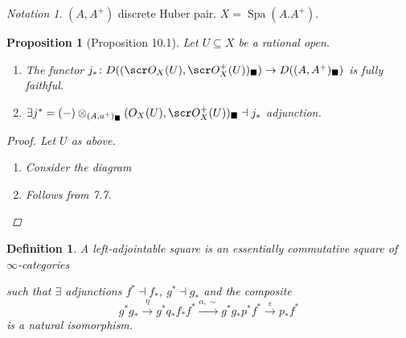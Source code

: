 \documentclass[A4paper, british, reqno]{amsart}
\theoremstyle{darkgreentheorem}
\newtheorem{prop}[thm]{Proposition}
\theoremstyle{darkbluedefinition}
\newtheorem{defn}[thm]{Definition}
\theoremstyle{darkredexample}
\theoremstyle{remark}
\newtheorem{nota}[thm]{Notation}
\DeclareMathOperator{\Cond}{Cond}
\DeclareMathOperator{\Spa}{Spa}
\newcommand{\1}{\mathbbm{1}}
\newcommand{\ot}{\otimes}
\newcommand{\sub}{\subseteq}
\newcommand{\usolid}{_{\blacksquare}}
\begin{document}
\begin{nota}
    $(A,A^{+})$ discrete Huber pair.
    $X=\Spa(A.A^{+})$.
\end{nota}

\begin{prop}[Proposition 10.1]
    Let $U\sub X$ be a rational open.
    \begin{enumerate}
	\item The functor $j_{*}\colon D((\O_{X}(U),\O_{X}^{+}(U))\usolid)\to D((A,A^{+})\usolid)$ is fully faithful.
	\item $\exists j^{*}=(-)\ot_{(A,a^{+})\usolid}(O_{X}(U),\O_{X}^{+}(U))\usolid \dashv j_{*}$ adjunction.
    \end{enumerate}
    \begin{proof}
	Let $U$ as above.
	\begin{enumerate}
	    \item Consider the diagram
		\begin{center}
		\end{center}
	    \item Follows from 7.7.
	\end{enumerate}
    \end{proof}
\end{prop}

\begin{defn}
    A \textit{left-adjointable square} is an essentially commutative square of $\infty$-categories
    \begin{center}
    \end{center}
    such that $\exists $ adjunctions $f^{*}\dashv f_{*}$, $g^{*}\dashv g_{*}$ and the composite
    \[ g^{*}g_{*}\xrightarrow{\eta} g^{*}q_{*}f_{*}f^{*}\xrightarrow{\alpha, \sim}g^{*}g_{*}p^{*}f^{*}\xrightarrow{\varepsilon} p_{*}f^{*} \]
    is a natural isomorphism.
\end{defn}
\end{document}

